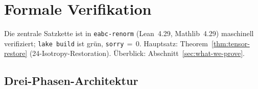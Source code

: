 \documentclass[11pt,a4paper]{article}
\begin{document}
	\section{Formale Verifikation}
	\label{sec:formal-verification}
	
	Die zentrale Satzkette ist in \texttt{eabc-renorm} (Lean~4.29, Mathlib~4.29)
	maschinell verifiziert; \texttt{lake build} ist grün, \texttt{sorry}\,$=\,0$.
	Hauptsatz: Theorem~\ref{thm:tensor-restore} (24-Isotropy-Restoration).
	Überblick: Abschnitt~\ref{sec:what-we-prove}.
	
	\begin{center}
		\small
		\begin{minipage}[t]{0.30\linewidth}
		\end{minipage}
		\hfill
		\begin{minipage}[t]{0.30\linewidth}
		\end{minipage}
		\hfill
		\begin{minipage}[t]{0.30\linewidth}
		\end{minipage}
	\end{center}
	
	\subsection{Drei-Phasen-Architektur}
	\label{sec:three-phases}
	
\end{document}
